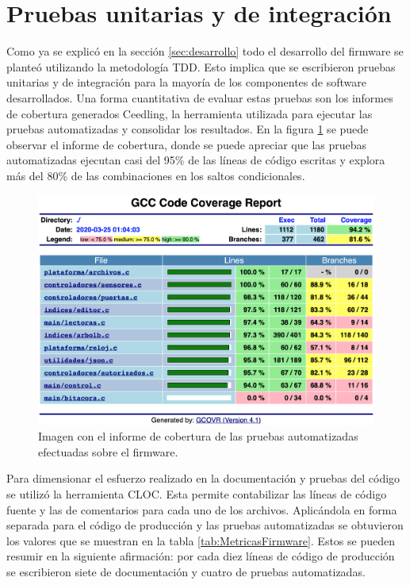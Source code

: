 \FloatBarrier

\section{Pruebas unitarias y de integración}
\label{sec:PruebasFirmware}

Como ya se explicó en la sección \ref{sec:desarrollo} todo el desarrollo del firmware se planteó utilizando la metodología TDD. Esto implica que se escribieron pruebas unitarias y de integración para la mayoría de los componentes de software desarrollados. Una forma cuantitativa de evaluar estas pruebas son los informes de cobertura generados Ceedling, la herramienta utilizada para ejecutar las pruebas automatizadas y consolidar los resultados. En la figura \ref{fig:Cobertura} se puede observar el informe de cobertura, donde se puede apreciar que las pruebas automatizadas ejecutan casi del 95\% de las líneas de código escritas y explora más del 80\% de las combinaciones en los saltos condicionales.

\begin{figure}[ht]
	\centering
	\includegraphics[width=\textwidth]{Figures/Cobertura.png}
	\caption[Informe con la cobertura de las pruebas]{Imagen con el informe de cobertura de las pruebas automatizadas efectuadas sobre el firmware.}
	\label{fig:Cobertura}
\end{figure}

Para dimensionar el esfuerzo realizado en la documentación y pruebas del código se utilizó la herramienta CLOC. Esta permite contabilizar las líneas de código fuente y las de comentarios para cada uno de los archivos. Aplicándola en forma separada para el código de producción y las pruebas automatizadas se obtuvieron los valores que se muestran en la tabla \ref{tab:MetricasFirmware}. Estos se pueden resumir en la siguiente afirmación: por cada diez líneas de código de producción se escribieron siete de documentación y cuatro de pruebas automatizadas.

